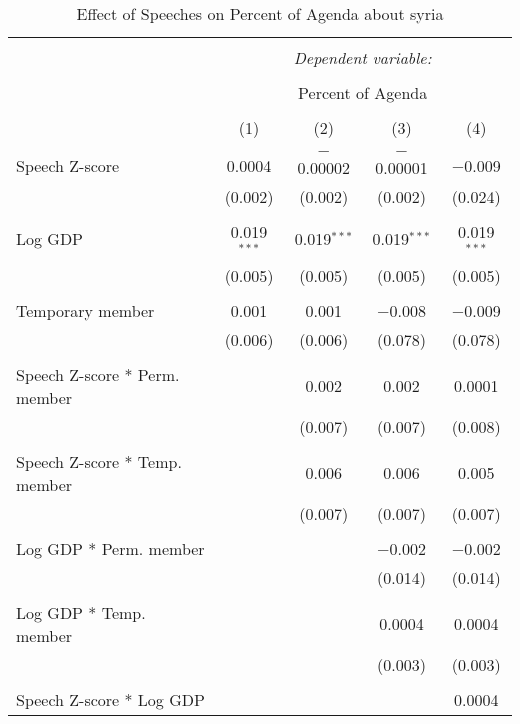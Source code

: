 
\begin{table}[!htbp] \centering 
  \caption{Effect of Speeches on Percent of Agenda about syria} 
  \label{} 
\begin{tabular}{@{\extracolsep{5pt}}lcccc} 
\\[-1.8ex]\hline 
\hline \\[-1.8ex] 
 & \multicolumn{4}{c}{\textit{Dependent variable:}} \\ 
\cline{2-5} 
\\[-1.8ex] & \multicolumn{4}{c}{Percent of Agenda} \\ 
\\[-1.8ex] & (1) & (2) & (3) & (4)\\ 
\hline \\[-1.8ex] 
 Speech Z-score & 0.0004 & $-$0.00002 & $-$0.00001 & $-$0.009 \\ 
  & (0.002) & (0.002) & (0.002) & (0.024) \\ 
  & & & & \\ 
 Log GDP & 0.019$^{***}$ & 0.019$^{***}$ & 0.019$^{***}$ & 0.019$^{***}$ \\ 
  & (0.005) & (0.005) & (0.005) & (0.005) \\ 
  & & & & \\ 
 Temporary member & 0.001 & 0.001 & $-$0.008 & $-$0.009 \\ 
  & (0.006) & (0.006) & (0.078) & (0.078) \\ 
  & & & & \\ 
 Speech Z-score * Perm. member &  & 0.002 & 0.002 & 0.0001 \\ 
  &  & (0.007) & (0.007) & (0.008) \\ 
  & & & & \\ 
 Speech Z-score * Temp. member &  & 0.006 & 0.006 & 0.005 \\ 
  &  & (0.007) & (0.007) & (0.007) \\ 
  & & & & \\ 
 Log GDP * Perm. member &  &  & $-$0.002 & $-$0.002 \\ 
  &  &  & (0.014) & (0.014) \\ 
  & & & & \\ 
 Log GDP * Temp. member &  &  & 0.0004 & 0.0004 \\ 
  &  &  & (0.003) & (0.003) \\ 
  & & & & \\ 
 Speech Z-score * Log GDP &  &  &  & 0.0004 \\ 

\end{tabular}
\end{table}
